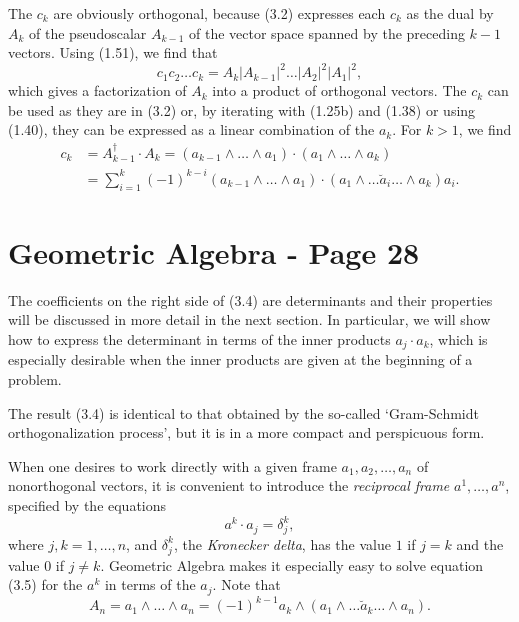 \documentclass[fleqn]{scrartcl}
\numberwithin{equation}{section}
\begin{document}
\noindent The \(c_k\) are obviously orthogonal, because (3.2) expresses each \(c_k\) as the dual by \(A_k\) of the pseudoscalar \(A_{k-1}\) of the vector space spanned by the preceding \(k-1\) vectors. Using (1.51), we find that
\begin{equation}
c_1 c_2 \dots c_k = A_k |A_{k-1}|^2 \dots |A_2|^2 |A_1|^2, \tag{3.3}
\end{equation}
which gives a factorization of \(A_k\) into a product of orthogonal vectors. The \(c_k\) can be used as they are in (3.2) or, by iterating with (1.25b) and (1.38) or using (1.40), they can be expressed as a linear combination of the \(a_k\). For \(k > 1\), we find
\begin{equation}
\begin{aligned}
c_k &= A_{k-1}^{\dagger} \cdot A_k = (a_{k-1} \wedge \dots \wedge a_1) \cdot (a_1 \wedge \dots \wedge a_k) \\
&= \sum_{i=1}^k (-1)^{k-i} (a_{k-1} \wedge \dots \wedge a_1) \cdot (a_1 \wedge \dots \breve{a}_i \dots \wedge a_k) a_i.
\end{aligned}
\tag{3.4}
\end{equation}

\section*{Geometric Algebra - Page 28}

\noindent The coefficients on the right side of (3.4) are determinants and their properties will be discussed in more detail in the next section. In particular, we will show how to express the determinant in terms of the inner products \(a_j \cdot a_k\), which is especially desirable when the inner products are given at the beginning of a problem.

\vspace{1em}
\noindent The result (3.4) is identical to that obtained by the so-called `Gram-Schmidt orthogonalization process', but it is in a more compact and perspicuous form.

\vspace{1em}
\noindent When one desires to work directly with a given frame \(a_1, a_2, \dots, a_n\) of nonorthogonal vectors, it is convenient to introduce the \textit{reciprocal frame} \(a^1, \dots, a^n\), specified by the equations
\begin{equation}
a^k \cdot a_j = \delta_j^k, \tag{3.5}
\end{equation}
where \(j, k = 1, \dots, n\), and \(\delta_j^k\), the \textit{Kronecker delta}, has the value \(1\) if \(j = k\) and the value \(0\) if \(j \neq k\). Geometric Algebra makes it especially easy to solve equation (3.5) for the \(a^k\) in terms of the \(a_j\). Note that
\begin{equation}
A_n = a_1 \wedge \dots \wedge a_n = (-1)^{k-1} a_k \wedge (a_1 \wedge \dots \breve{a}_k \dots \wedge a_n). \tag{3.6}
\end{equation}
\end{document}
